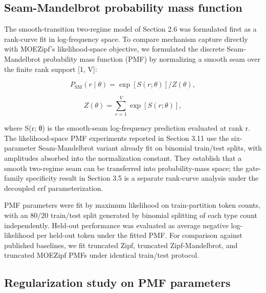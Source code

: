 \documentclass[11pt]{article}
\begin{document}
\subsection{Seam-Mandelbrot probability mass function}\label{sec:pmf}

The smooth-transition two-regime model of Section 2.6 was formulated first as a rank-curve fit in log-frequency space. To compare mechanism capture directly with MOEZipf's likelihood-space objective, we formulated the discrete Seam-Mandelbrot probability mass function (PMF) by normalizing a smooth seam over the finite rank support [1, V]:

\begin{equation}
\tag{20}\label{eq:pmf-unnorm}
P_{\mathrm{SM}}(r \mid \theta) = \exp[S(r;\theta)] / Z(\theta),
\end{equation}

\begin{equation}
\tag{21}\label{eq:pmf-Z}
Z(\theta) = \sum_{r=1}^{V} \exp[S(r;\theta)],
\end{equation}

where S(r; θ) is the smooth-seam log-frequency prediction evaluated at rank r. The likelihood-space PMF experiments reported in Section 3.11 use the six-parameter Seam-Mandelbrot variant already fit on binomial train/test splits, with amplitudes absorbed into the normalization constant. They establish that a smooth two-regime seam can be transferred into probability-mass space; the gate-family specificity result in Section 3.5 is a separate rank-curve analysis under the decoupled erf parameterization.

PMF parameters were fit by maximum likelihood on train-partition token counts, with an 80/20 train/test split generated by binomial splitting of each type count independently. Held-out performance was evaluated as average negative log-likelihood per held-out token under the fitted PMF. For comparison against published baselines, we fit truncated Zipf, truncated Zipf-Mandelbrot, and truncated MOEZipf PMFs under identical train/test protocol.

\subsection{Regularization study on PMF parameters}
\end{document}

